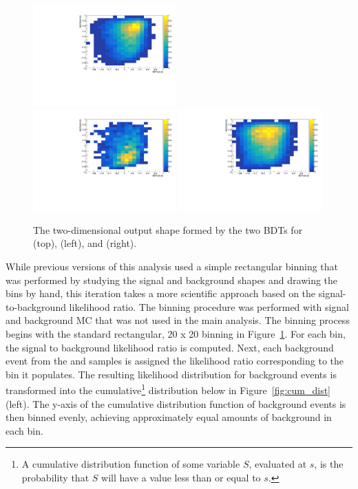 \begin{figure}[htp]
\centering
\includegraphics[width=0.49\textwidth]{ch9_figs/tth_2l_2D.pdf}\\
\includegraphics[width=0.49\textwidth]{ch9_figs/tt_2l_2D.pdf}
\includegraphics[width=0.49\textwidth]{ch9_figs/ttw_2l_2D.pdf}
\caption[Two dimensional BDT output shapes of signal and backgrounds]{The two-dimensional output shape formed by the two BDTs for \tth (top), \ttbar (left), and \ttv (right).}
\label{fig:2d_shapes}
\end{figure}

While previous versions of this analysis used a simple rectangular binning that was performed by studying the signal and background shapes and drawing the bins by hand,
this iteration takes a more scientific approach based on the signal-to-background likelihood ratio. The binning procedure was performed with signal and background MC that was not used
in the main analysis. The binning process begins with the standard rectangular, 20 x 20 binning in Figure~\ref{fig:2d_shapes}. For each bin, the signal to background likelihood ratio is computed.
Next, each background event from the \ttbar and \ttv samples is assigned the likelihood ratio corresponding to the bin it populates. The resulting likelihood distribution for background
events is transformed into the cumulative\footnote{A cumulative distribution function of some variable $S$, evaluated at $s$, is the probability that $S$ will have a value less than or equal
to $s$.} distribution below in Figure~\ref{fig:cum_dist} (left). The y-axis of the cumulative distribution function of background events is then binned evenly, achieving approximately equal
amounts of background in each bin.

